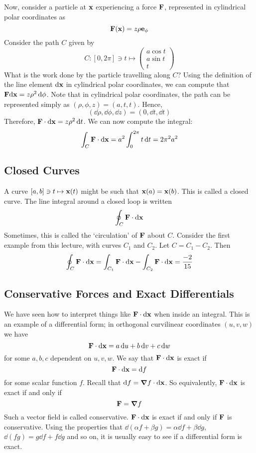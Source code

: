 Now, consider a particle at \(\vb x\) experiencing a force \(\vb F\), represented in cylindrical polar coordinates as
\[
	\vb F(\vb x) = z\rho \vb e_{\phi}
\]
Consider the path \(C\) given by
\[
	C \colon [0, 2\pi] \ni t \mapsto \begin{pmatrix}
		a \cos t \\ a \sin t \\ t
	\end{pmatrix}
\]
What is the work done by the particle travelling along \(C\)? Using the definition of the line element \(\dd \vb x\) in cylindrical polar coordinates, we can compute that \(\vb F \dd \vb x = z \rho^2 \dd{\phi}\).
Note that in cylindrical polar coordinates, the path can be represented simply as \((\rho, \phi, z) = (a, t, t)\).
Hence,
\[
	(\dd{\rho}, \dd{\phi}, \dd{z}) = (0, \dd{t}, \dd{t})
\]
Therefore, \(\vb F \cdot \dd \vb x = z \rho^2 \dd{t}\).
We can now compute the integral:
\[
	\int_C \vb F \cdot \dd \vb x = a^2 \int_0^{2\pi} t\dd{t} = 2\pi^2a^2
\]

\subsection{Closed Curves}
A curve \([a, b] \ni t \mapsto \vb x(t)\) might be such that \(\vb x(a) = \vb x(b)\).
This is called a closed curve.
The line integral around a closed loop is written
\[
	\oint_C \vb F \cdot \dd \vb x
\]
Sometimes, this is called the `circulation' of \(\vb F\) about \(C\).
Consider the first example from this lecture, with curves \(C_1\) and \(C_2\).
Let \(C = C_1 - C_2\).
Then
\[
	\oint_C \vb F \cdot \dd \vb x = \int_{C_1} \vb F \cdot \dd \vb x - \int_{C_2} \vb F \cdot \dd \vb x = \frac{-2}{15}
\]

\subsection{Conservative Forces and Exact Differentials}
We have seen how to interpret things like \(\vb F \cdot \dd \vb x\) when inside an integral.
This is an example of a differential form; in orthogonal curvilinear coordinates \((u, v, w)\) we have
\[
	\vb F \cdot \dd \vb x = a \dd{u} + b \dd{v} + c \dd{w}
\]
for some \(a, b, c\) dependent on \(u, v, w\).
We say that \(\vb F \cdot \dd \vb x\) is exact if
\[
	\vb F \cdot \dd \vb x = \dd{f}
\]
for some scalar function \(f\).
Recall that \(\dd{f} = \grad f \cdot \dd \vb x\).
So equivalently, \(\vb F \cdot \dd \vb x\) is exact if and only if
\[
	\vb F = \grad f
\]
Such a vector field is called conservative.
\(\vb F \cdot \dd \vb x\) is exact if and only if \(\vb F\) is conservative.
Using the properties that \(\dd (\alpha f + \beta g) = \alpha \dd{f} + \beta \dd{g}\), \(\dd (fg) = g \dd{f} + f \dd{g}\) and so on, it is usually easy to see if a differential form is exact.

